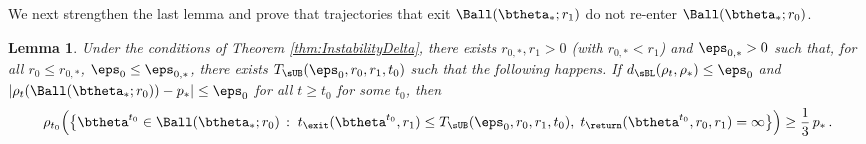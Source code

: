 \documentclass[11pt]{article}
\newtheorem{lemma}{Lemma}
\begin{document}
We next strengthen the last lemma and prove that trajectories that exit $\Ball(\btheta_*;r_1)$ do not re-enter
$\Ball(\btheta_*;r_0)$.
%
\begin{lemma}\label{lemma:NoReturn}
Under the conditions of Theorem \ref{thm:InstabilityDelta}, there exists $r_{0,*},r_1>0$ (with $r_{0,*}<r_1$) and $\eps_{0,*}>0$ such that, for all $r_0\le r_{0,*}$, $\eps_0\le \eps_{0,*}$, there exists 
$T_{\sUB}(\eps_0,r_0,r_1, t_0)$ such that the following happens. 
If $d_{\sBL}(\rho_t,\rho_*)\le \eps_0$ and $|\rho_t(\Ball(\btheta_*;r_0))-p_*|\le \eps_0$ for all $t \ge t_0$ for some $t_0$, then
%
\begin{align}
%
\rho_{t_0}\Big(\big\{\btheta^{t_0} \in \Ball(\btheta_*;r_0)\, :\; t_{\exit}(\btheta^{t_0},r_1) \le T_{\sUB}(\eps_0,r_0,r_1, t_0), \;  t_{\return}(\btheta^{t_0},r_0,r_1)=\infty\big\}\Big)\ge \frac{1}{3}\, p_*\, .
\label{eq:ExitClaim}
%
\end{align}
\end{lemma}
%
\end{document}
